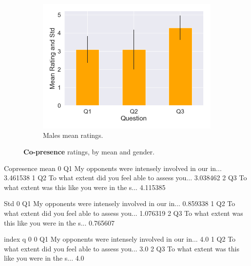 \begin{figure}[H]
\begin{subfigure}[b]{0.3\textwidth}
 \label{fig:copresFemale}
 \end{subfigure}
  \hspace{10mm}
 \begin{subfigure}[b]{0.3\textwidth}
 \centering
 \includegraphics[scale=0.33]{Files/Plots/copresence_mean_m.png}
 \caption{Males mean ratings.}
 \label{fig:copresMale}
 \end{subfigure}
 \caption{\textbf{Co-presence} ratings, by mean and gender.}
\label{fig:coAll}
\end{figure}

Copresence mean
0    Q1  My opponents were intensely involved in our in...  3.461538
1    Q2  To what extent did you feel able to assess you...  3.038462
2    Q3  To what extent was this like you were in the s...  4.115385

Std
0    Q1  My opponents were intensely involved in our in...  0.859338
1    Q2  To what extent did you feel able to assess you...  1.076319
2    Q3  To what extent was this like you were in the s...  0.765607


  index                                                  q    0
0    Q1  My opponents were intensely involved in our in...  4.0
1    Q2  To what extent did you feel able to assess you...  3.0
2    Q3  To what extent was this like you were in the s...  4.0


